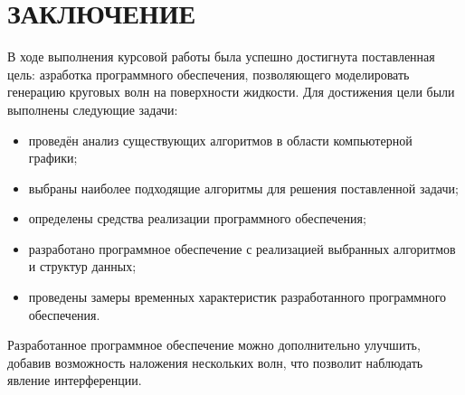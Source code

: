 \chapter*{ЗАКЛЮЧЕНИЕ}

В ходе выполнения курсовой работы была успешно достигнута поставленная цель:  
азработка программного обеспечения, позволяющего моделировать генерацию круговых волн на
поверхности жидкости.
Для достижения цели были выполнены следующие задачи:  
\begin{itemize}  
    \item проведён анализ существующих алгоритмов в области компьютерной графики;  
    \item выбраны наиболее подходящие алгоритмы для решения поставленной задачи;  
    \item определены средства реализации программного обеспечения;  
    \item разработано программное обеспечение с реализацией выбранных алгоритмов и структур данных;  
    \item проведены замеры временных характеристик разработанного программного обеспечения.  
\end{itemize}  

Разработанное программное обеспечение можно дополнительно улучшить, добавив возможность наложения нескольких волн, что позволит наблюдать явление интерференции.  
